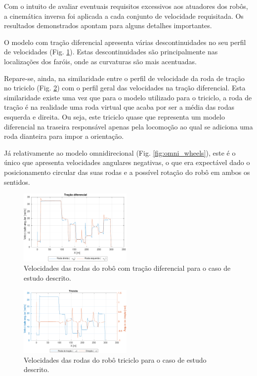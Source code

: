 \documentclass[twocolumn]{article}
\begin{document}
Com o intuito de avaliar eventuais requisitos excessivos aos atuadores dos robôs, a cinemática inversa foi aplicada a cada conjunto de velocidade requisitada. Os resultados demonstrados apontam para alguns detalhes importantes.

O modelo com tração diferencial apresenta várias descontinuidades no seu perfil de velocidades (Fig. \ref{fig:diff_wheels}). Estas descontinuidades são principalmente nas localizações dos faróis, onde as curvaturas são mais acentuadas.

Repare-se, ainda, na similaridade entre o perfil de velocidade da roda de tração no triciclo (Fig. \ref{fig:tri_wheels}) com o perfil geral das velocidades na tração diferencial. Esta similaridade existe uma vez que para o modelo utilizado para o triciclo, a roda de tração é na realidade uma roda virtual que acaba por ser a média das rodas esquerda e direita. Ou seja, este triciclo quase que representa um modelo diferencial na traseira responsável apenas pela locomoção ao qual se adiciona uma roda dianteira para impor a orientação.

Já relativamente ao modelo omnidirecional (Fig. \ref{fig:omni_wheels}), este é o único que apresenta velocidades angulares negativas, o que era expectável dado o posicionamento circular das suas rodas e a possível rotação do robô em ambos os sentidos.

\begin{figure}[ht]
    \centering
    \includegraphics[width=0.49\textwidth]{figs/diff_wheels.pdf}
    \caption{Velocidades das rodas do robô com tração diferencial para o caso de estudo descrito.}
    \label{fig:diff_wheels}
\end{figure}

\begin{figure}[ht]
    \centering
    \includegraphics[width=0.49\textwidth]{figs/tri_wheels.pdf}
    \caption{Velocidades das rodas do robô triciclo para o caso de estudo descrito.}
    \label{fig:tri_wheels}
\end{figure}
\end{document}
